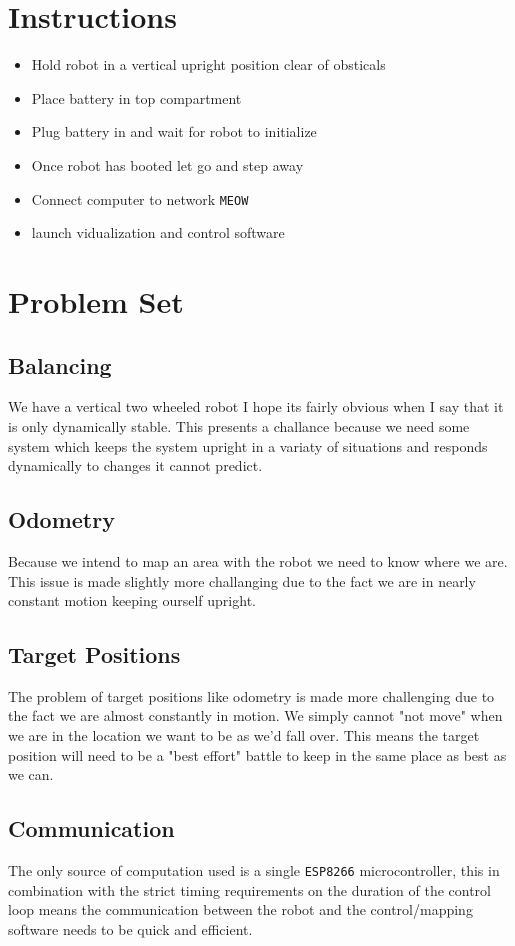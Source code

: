 \documentclass[12pt]{article}
\begin{document}
\section{Instructions}
\begin{itemize}
	\item Hold robot in a vertical upright position clear of obsticals
	\item Place battery in top compartment
	\item Plug battery in and wait for robot to initialize
	\item Once robot has booted let go and step away
	\item Connect computer to network \texttt{MEOW}
	\item launch vidualization and control software
\end{itemize}

\section{Problem Set}

\subsection{Balancing}
We have a vertical two wheeled robot I hope its fairly obvious when I say that it is only dynamically stable. This presents a challance because we need some system which keeps the system upright in a variaty of situations and responds dynamically to changes it cannot predict.
\subsection{Odometry}
Because we intend to map an area with the robot we need to know where we are. This issue is made slightly more challanging due to the fact we are in nearly constant motion keeping ourself upright.
\subsection{Target Positions}
The problem of target positions like odometry is made more challenging due to the fact we are almost constantly in motion. We simply cannot "not move" when we are in the location we want to be as we'd fall over. This means the target position will need to be a "best effort" battle to keep in the same place as best as we can.
\subsection{Communication}
The only source of computation used is a single \texttt{ESP8266} microcontroller, this in combination with the strict timing requirements on the duration of the control loop means the communication between the robot and the control/mapping software needs to be quick and efficient.
\end{document}
